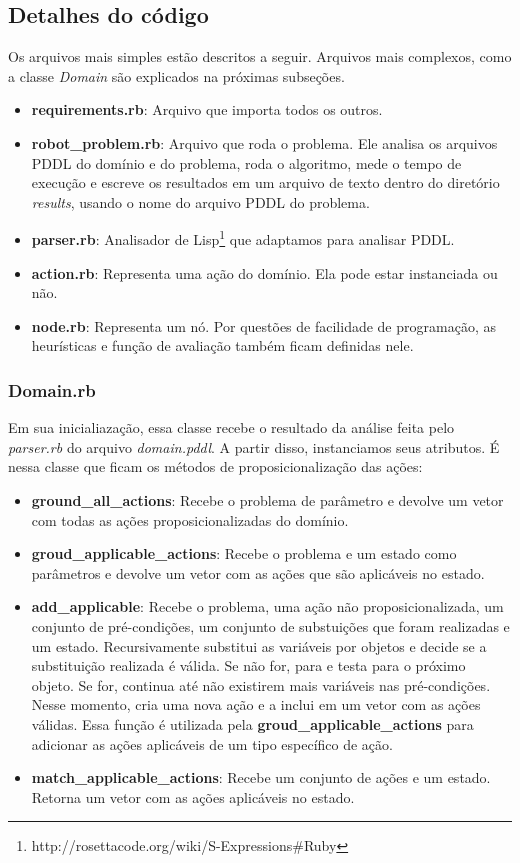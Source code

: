 \documentclass[12pt,a4paper]{article}
\begin{document}
\subsection{Detalhes do código}\label{implementacao:detalhes}
Os arquivos mais simples estão descritos a seguir. Arquivos mais complexos, como a classe \textit{Domain} são explicados na próximas subseções.
    \begin{itemize}
        \item \textbf{requirements.rb}: Arquivo que importa todos os outros.
        \item \textbf{robot\_problem.rb}: Arquivo que roda o problema. Ele analisa os arquivos PDDL do domínio e do problema, roda o algoritmo, mede o tempo de execução e escreve os resultados em um arquivo de texto dentro do diretório \textit{results}, usando o nome do arquivo PDDL do problema.
        \item \textbf{parser.rb}: Analisador de Lisp\footnote{http://rosettacode.org/wiki/S-Expressions\#Ruby} que adaptamos para analisar PDDL.
        \item \textbf{action.rb}: Representa uma ação do domínio. Ela pode estar instanciada ou não.
        \item \textbf{node.rb}: Representa um nó. Por questões de facilidade de programação, as heurísticas e função de avaliação também ficam definidas nele.
    \end{itemize}
    
\subsubsection{Domain.rb}\label{implementacao:detalhes:dominio}
Em sua inicialiazação, essa classe recebe o resultado da análise feita pelo \textit{parser.rb} do arquivo \textit{domain.pddl}. A partir disso, instanciamos seus atributos. É nessa classe que ficam os métodos de proposicionalização das ações:
    \begin{itemize}
        \item \textbf{ground\_all\_actions}: Recebe o problema de parâmetro e devolve um vetor com todas as ações proposicionalizadas do domínio.
        \item \textbf{groud\_applicable\_actions}: Recebe o problema e um estado como parâmetros e devolve um vetor com as ações que são aplicáveis no estado.
        \item \textbf{add\_applicable}: Recebe o problema, uma ação não proposicionalizada, um conjunto de pré-condições, um conjunto de substuições que foram realizadas e um estado. Recursivamente substitui as variáveis por objetos e decide se a substituição realizada é válida. Se não for, para e testa para o próximo objeto. Se for, continua até não existirem mais variáveis nas pré-condições. Nesse momento, cria uma nova ação e a inclui em um vetor com as ações válidas. Essa função é utilizada pela \textbf{groud\_applicable\_actions} para adicionar as ações aplicáveis de um tipo específico de ação.
        \item \textbf{match\_applicable\_actions}: Recebe um conjunto de ações e um estado. Retorna um vetor com as ações aplicáveis no estado.
    \end{itemize}
\end{document}
